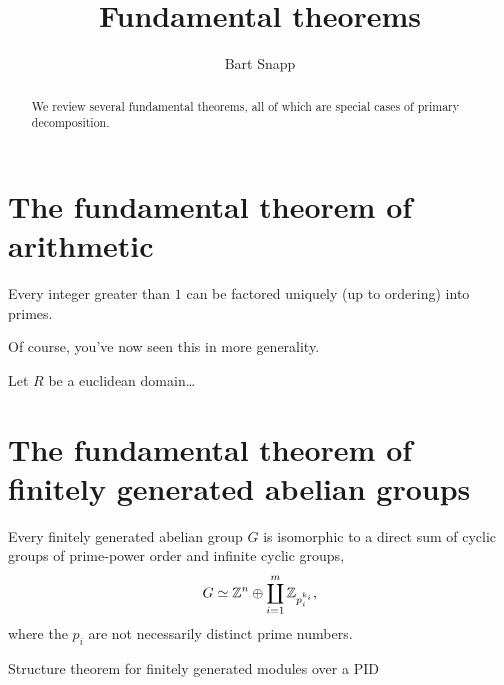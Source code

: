 \documentclass{ximera}
\author{Bart Snapp}
\title{Fundamental theorems}
\begin{document}
\begin{abstract}
  We review several fundamental theorems, all of which are special cases of primary decomposition.
\end{abstract}
\maketitle

\section{The fundamental theorem of arithmetic}

\begin{theorem}
  Every integer greater than $1$ can be factored uniquely (up to
  ordering) into primes.
\end{theorem}

Of course, you've now seen this in more generality.

\begin{theorem}
  Let $R$ be a euclidean domain\dots
\end{theorem}


\section{The fundamental theorem of finitely generated abelian groups}

\begin{theorem}
  Every finitely generated abelian group $G$ is isomorphic to a
  direct sum of cyclic groups of prime-power order and infinite cyclic
  groups,
  \[
  G \simeq \mathbb Z^n \oplus \coprod_{i=1}^{m} \mathbb Z_{p_i^{k_i}},
  \]
  where the $p_i$ are not necessarily distinct prime numbers.
\end{theorem}


Structure theorem for finitely generated modules over a PID
\end{document}

